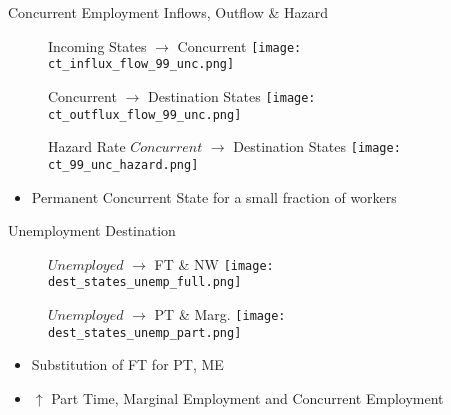 \documentclass[hyperref={bookmarks=false}]{beamer}
\let\oldcite=\cite
\renewcommand{\cite}[1]{\textcolor[rgb]{.0,.2,.7}{\oldcite{#1}}}
\begin{document}
\begin{appendix}
\begin{frame}{Concurrent Employment Inflows, Outflow \& Hazard}
\begin{figure}[!t]
\centering
\begin{minipage}[b]{0.3\textwidth}{Incoming States $\rightarrow$ Concurrent}
\centering
\texttt{[image: ct\_influx\_flow\_99\_unc.png]}
\end{minipage}
\begin{minipage}[b]{0.3\textwidth}{Concurrent $\rightarrow$ Destination States }
\centering
\texttt{[image: ct\_outflux\_flow\_99\_unc.png]}
\end{minipage}
\begin{minipage}[b]{0.3\textwidth}{Hazard Rate $Concurrent$ $\rightarrow$ Destination States}
\centering
\texttt{[image: ct\_99\_unc\_hazard.png]}
\end{minipage}
\end{figure}
\begin{itemize}
\setlength{\itemsep}{0.7 cm}
\item Permanent Concurrent State for a small fraction of workers \cite{CarriTuRo15}
\end{itemize}
\end{frame}

\begin{frame}{Unemployment Destination}
\begin{figure}[!t]
\centering
\begin{minipage}[b]{0.3\textwidth}{$Unemployed$ $\rightarrow$ FT \& NW}
\centering
\texttt{[image: dest\_states\_unemp\_full.png]}
\end{minipage}
\begin{minipage}[b]{0.3\textwidth}{$Unemployed$ $\rightarrow$ PT \& Marg.}
\centering
\texttt{[image: dest\_states\_unemp\_part.png]}
\end{minipage}
\end{figure}
\begin{itemize}
\setlength{\itemsep}{0.7 cm}
\item Substitution of FT for PT, ME
\item $\uparrow$ Part Time, Marginal Employment and Concurrent Employment \cite{CarriTuRo15}\hyperlink{DATA}{}
\end{itemize}
\end{frame}


\end{appendix}
\end{document}
